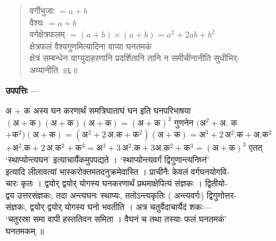\documentclass[11pt,a4paper]{article}
\newcommand{\skt}[1]{{\devanagarifont\color{sktcolor} #1}}
\newenvironment{shloka}{%
  \begin{quote}%
  \smallskip%
  \devanagarifont\color{sktcolor}%
}{%
  \smallskip%
  \end{quote}%
}
\newenvironment{upapatti}{%
  \smallskip%
  \noindent\textbf{\devanagarifont उपपत्तिः} — \devanagarifont\small%
}{%
  \par\smallskip%
}
\begin{document}
\begin{shloka}
\skt{वर्गीभुजाः} $= a + b$\\[0.5em]
\skt{वैश्यः} $= a + b$\\[0.5em]
\skt{वर्गक्षेत्रफलम्} $= (a+b) \times (a+b) = a^2 + 2ab + b^2$\\[0.5em]
\skt{क्षेत्रफलं वैश्यगुणमित्यादिना वाप्या घनतमकं}\\
\skt{क्षेत्रं सम्बन्धेन याग्युदाहरणानि प्रदर्शितानि तानि न समीचीनानीति सुधीभिर्-}\\
\skt{अव्यानीति} ॥६॥
\end{shloka}

\vspace{0.5cm}

\begin{upapatti}
\skt{अ + क अस्य घन करणार्थं समत्रिघाताघं घन इति घनपरिभाषया}\\
$(\text{अ} + \text{क})(\text{अ} + \text{क})(\text{अ} + \text{क}) = (\text{अ} + \text{क})^3$ \skt{गुणनेन} $(\text{अ}^2 + \text{अ. क}$\\
$+ \text{क}^2)(\text{अ} + \text{क}) = (\text{अ}^2 + 2\,\text{अ.क} + \text{क}^2)(\text{अ} + \text{क}) = \text{अ}^3 + 2\,\text{अ}^2.\text{क} + \text{अ.क}^2$\\
$+ \text{अ}^2.\text{क} + 2\,\text{अ.क}^2 + \text{क}^3 = \text{अ}^3 + 3\,\text{अ}^2.\text{क} + 3\text{अ.क}^2 + \text{क}^3 = (\text{अ} + \text{क})^3$ \skt{एतत्}\\
\skt{`स्थाप्योन्त्यघन' इत्याचार्यैकमुपपद्यते । `स्थाप्योन्त्यवर्गं द्विगुणान्त्यनिघ्नं' }\\
\skt{इत्यादि लीलावत्यां भास्करोक्तमतदनुक्रमेवास्ति । प्राचीनैः केवलं वर्गघनयोगवि-}\\
\skt{चारः कृतः । द्वयोर् द्वयोर् योगस्य घनकरणार्थं प्रथमाक्षेपित्यं संज्ञकः । द्वितीयो-}\\
\skt{द्वय उत्तरसंज्ञकः, तदा अन्त्यघनः स्थाप्यः, ततोऽन्त्यकृतिः} (\skt{अन्त्यवर्गः}) \skt{द्विगुणोत्तर-}\\
\skt{संज्ञकः, द्वयोर् द्वयोर् योगस्य घनो भवतीति । अत्र चतुर्वेदाचार्यैदं शकः—}\\
\skt{`चतुरस्रा समा वापी हस्ततिवन समिता । वैघनं च तथा तस्याः फलं घनतमकं'}\\
\skt{घनतमकम्} ॥
\end{upapatti}

\vspace{0.5cm}
\end{document}
